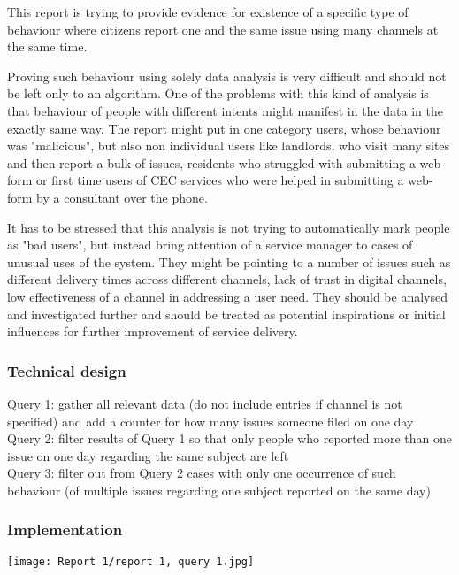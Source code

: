 This report is trying to provide evidence for existence of a specific type of behaviour where citizens report one and the same issue using many channels at the same time.

Proving such behaviour using solely data analysis is very difficult and should not be left only to an algorithm. One of the problems with this kind of analysis is that behaviour of people with different intents might manifest in the data in the exactly same way. The report might put in one category users, whose behaviour was "malicious", but also non individual users like landlords, who visit many sites and then report a bulk of issues, residents who struggled with submitting a web-form or first time users of CEC services who were helped in submitting a web-form by a consultant over the phone.

It has to be stressed that this analysis is not trying to automatically mark people as "bad users", but instead bring attention of a service manager to cases of unusual uses of the system. They might be pointing to a number of issues such as different delivery times across different channels, lack of trust in digital channels, low effectiveness of a channel in addressing a user need. They should be analysed and investigated further and should be treated as potential inspirations or initial influences for further improvement of service delivery.

			\subsubsection{Technical design}
Query 1: gather all relevant data (do not include entries if channel is not specified) and add a counter for how many issues someone filed on one day\\
Query 2: filter results of Query 1 so that only people who reported more than one issue on one day regarding the same subject are left\\
Query 3: filter out from Query 2 cases with only one occurrence of such behaviour (of multiple issues regarding one subject reported on the same day)

			\subsubsection{Implementation}

\begin{center}
  \texttt{[image: Report 1/report 1, query 1.jpg]}
  \label{normal_case}
\end{center}

